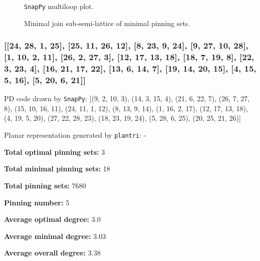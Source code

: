 \documentclass{article}%
\begin{document}
\begin{multicols}{2}
\begin{figure}[H]
\centering

\caption{\texttt{SnapPy} multiloop plot.}
\label{fig:tex/img/[[20, 24, 1, 21], [21, 13, 22, 14], [10, 19, 11, 20], [11, 23, 12, 24], [1, 12, 2, 13], [22, 2, 23, 3], [14, 6, 15, 5], [9, 4, 10, 5], [18, 3, 19, 4], [6, 25, 7, 28], [15, 28, 16, 27], [8, 26, 9, 27],.svg}
\end{figure}
\columnbreak

\begin{figure}[H]
\centering
\scalebox{0.8}{}
\caption{Minimal join sub-semi-lattice of minimal pinning sets.}
\label{fig:tex/img/[[20, 24, 1, 21], [21, 13, 22, 14], [10, 19, 11, 20], [11, 23, 12, 24], [1, 12, 2, 13], [22, 2, 23, 3], [14, 6, 15, 5], [9, 4, 10, 5], [18, 3, 19, 4], [6, 25, 7, 28], [15, 28, 16, 27], [8, 26, 9, 27],.pgf}
\end{figure}
\end{multicols}

\newpage

\subsubsection{[[24, 28, 1, 25], [25, 11, 26, 12], [8, 23, 9, 24], [9, 27, 10, 28], [1, 10, 2, 11], [26, 2, 27, 3], [12, 17, 13, 18], [18, 7, 19, 8], [22, 3, 23, 4], [16, 21, 17, 22], [13, 6, 14, 7], [19, 14, 20, 15], [4, 15, 5, 16], [5, 20, 6, 21]]}

{\small\noindent PD code drawn by \texttt{SnapPy}: [(9, 2, 10, 3), (14, 3, 15, 4), (21, 6, 22, 7), (26, 7, 27, 8), (15, 10, 16, 11), (24, 11, 1, 12), (8, 13, 9, 14), (1, 16, 2, 17), (12, 17, 13, 18), (4, 19, 5, 20), (27, 22, 28, 23), (18, 23, 19, 24), (5, 28, 6, 25), (20, 25, 21, 26)]}

{\small\noindent Planar representation generated by \texttt{plantri}: -}

\begin{multicols}{2}
{\normalsize \noindent\textbf{Total optimal pinning sets:} 3

\noindent\textbf{Total minimal pinning sets:} 18

\noindent\textbf{Total pinning sets:} 7680

\noindent\textbf{Pinning number:} 5

}
\columnbreak

{\normalsize \noindent\textbf{Average optimal degree:} 3.0

\noindent\textbf{Average minimal degree:} 3.03

\noindent\textbf{Average overall degree:} 3.38

}
\end{multicols}
\end{document}
